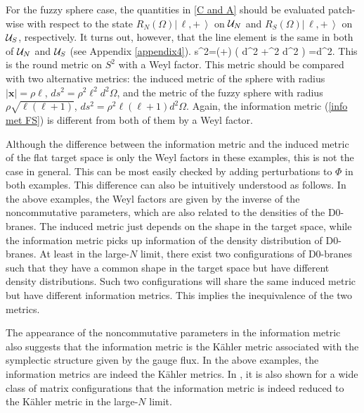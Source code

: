\documentclass[12pt]{article}
\numberwithin{equation}{section}
\newcommand{\Ket}[1]{\left|\, #1\,\right\rangle}
\def\bea#1\ena{\begin{align}#1\end{align}}
\begin{document}
For the fuzzy sphere case, 
the quantities in \eqref{C and A} should be evaluated 
patch-wise with respect to the state
$R_N (\Omega)\Ket{\ell,+}$ on ${\cal U}_N$ and 
$R_S (\Omega)\Ket{\ell,+}$ on ${\cal U}_S$, respectively.
It turns out, however, that the line element is the same in both 
of ${\cal U}_N$ and ${\cal U}_S$ {(see Appendix \ref{appendix4})}.
\bea
ds^2=\left(\ell+\right)
\left( d\theta^2 +\sin^2 \theta d\varphi^2 \right)
=d^2\Omega.
\label{info met FS}
\ena
This is the round metric on $S^2$ with a Weyl factor.
This metric should be compared with two alternative metrics:
the induced metric {of} the sphere with radius $|\boldsymbol{x}|=\rho\ell$, 
$ds^2=\rho^2\ell^2 d^2\Omega $, {and the metric of the}
fuzzy sphere with radius $\rho \sqrt{\ell(\ell+1)}$, 
$ds^2=\rho^2 \ell(\ell+1)d^2\Omega$.
Again, the information metric (\ref{info met FS}) is different from both of them 
by {a} Weyl factor. 

Although the difference between the 
information metric and the induced metric of the flat target space 
is only the Weyl factors in these examples,
this is not the case in general. 
This can be most easily checked by adding perturbations to $\Phi$ in 
both examples. 
This difference can also be intuitively understood as follows.
In the above examples, 
the Weyl factors are given by the inverse of the noncommutative parameters,
which are also related to the densities of the D0-branes.
The induced metric just depends on the shape in the target space, while
the information metric picks up information of the density distribution 
of D0-branes.
At least in the large-$N$ limit, there exist two 
configurations of D0-branes such that they 
have a common shape in the target space but have 
different density distributions. 
Such two configurations will share the same induced metric but 
have different information metrics. This implies the inequivalence of 
the two metrics.

The appearance of the noncommutative parameters in the information metric 
also suggests that the information metric is the K\"{a}hler metric associated
with the symplectic structure given by the gauge flux.
In the above examples, the information metrics are indeed the K\"{a}hler 
metrics. 
In \cite{Ishiki2016}, it is also shown for a wide class of matrix 
configurations that the information metric 
is indeed reduced to the K\"{a}hler metric in the large-$N$ limit.
\end{document}
